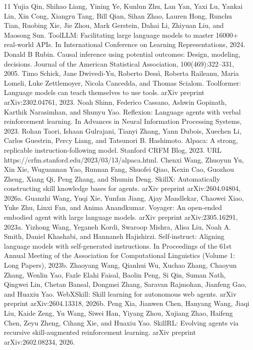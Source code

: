 11
Yujia Qin, Shihao Liang, Yining Ye, Kunlun Zhu, Lan Yan, Yaxi Lu, Yankai Lin, Xin Cong, Xiangru
Tang, Bill Qian, Sihan Zhao, Lauren Hong, Runchu Tian, Ruobing Xie, Jie Zhou, Mark Gerstein,
Dahai Li, Zhiyuan Liu, and Maosong Sun. ToolLLM: Facilitating large language models to master
16000+ real-world APIs. In International Conference on Learning Representations, 2024.
Donald B Rubin. Causal inference using potential outcomes: Design, modeling, decisions. Journal
of the American Statistical Association, 100(469):322–331, 2005.
Timo Schick, Jane Dwivedi-Yu, Roberto Dessì, Roberta Raileanu, Maria Lomeli, Luke Zettlemoyer,
Nicola Cancedda, and Thomas Scialom. Toolformer: Language models can teach themselves to
use tools. arXiv preprint arXiv:2302.04761, 2023.
Noah Shinn, Federico Cassano, Ashwin Gopinath, Karthik Narasimhan, and Shunyu Yao. Reflexion:
Language agents with verbal reinforcement learning. In Advances in Neural Information Processing
Systems, 2023.
Rohan Taori, Ishaan Gulrajani, Tianyi Zhang, Yann Dubois, Xuechen Li, Carlos Guestrin, Percy Liang,
and Tatsunori B. Hashimoto. Alpaca: A strong, replicable instruction-following model. Stanford
CRFM Blog, 2023. URL https://crfm.stanford.edu/2023/03/13/alpaca.html.
Chenxi Wang, Zhuoyun Yu, Xin Xie, Wuguannan Yao, Runnan Fang, Shuofei Qiao, Kexin Cao,
Guozhou Zheng, Xiang Qi, Peng Zhang, and Shumin Deng. SkillX: Automatically constructing
skill knowledge bases for agents. arXiv preprint arXiv:2604.04804, 2026a.
Guanzhi Wang, Yuqi Xie, Yunfan Jiang, Ajay Mandlekar, Chaowei Xiao, Yuke Zhu, Linxi Fan, and
Anima Anandkumar. Voyager: An open-ended embodied agent with large language models. arXiv
preprint arXiv:2305.16291, 2023a.
Yizhong Wang, Yeganeh Kordi, Swaroop Mishra, Alisa Liu, Noah A. Smith, Daniel Khashabi, and
Hannaneh Hajishirzi. Self-instruct: Aligning language models with self-generated instructions. In
Proceedings of the 61st Annual Meeting of the Association for Computational Linguistics (Volume
1: Long Papers), 2023b.
Zhaoyang Wang, Qianhui Wu, Xuchao Zhang, Chaoyun Zhang, Wenlin Yao, Fazle Elahi Faisal,
Baolin Peng, Si Qin, Suman Nath, Qingwei Lin, Chetan Bansal, Dongmei Zhang, Saravan
Rajmohan, Jianfeng Gao, and Huaxiu Yao. WebXSkill: Skill learning for autonomous web agents.
arXiv preprint arXiv:2604.13318, 2026b.
Peng Xia, Jianwen Chen, Hanyang Wang, Jiaqi Liu, Kaide Zeng, Yu Wang, Siwei Han, Yiyang Zhou,
Xujiang Zhao, Haifeng Chen, Zeyu Zheng, Cihang Xie, and Huaxiu Yao. SkillRL: Evolving agents
via recursive skill-augmented reinforcement learning. arXiv preprint arXiv:2602.08234, 2026.
